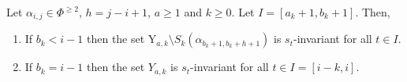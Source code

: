 \begin{lemma}\label{claim: third string lemma 1}
Let  $\alpha_{i,j} \in \Phi^{\geq 2}$, $h=j-i+1$,  $a\geq 1$ and $k\geq 0$.    
Let $I=[a_k+1, b_k+1]$.
Then,  
\begin{enumerate}
    \item\label{item (1) claim third string lemma 1}  If  $b_{k}<i-1$ then the set $\mathrm{Y}_{a,k}\setminus S_k(\alpha_{b_k+1,b_k+h+1}) $ is $s_t$-invariant  for all $t\in I$. 
    \item\label{item (2) claim third string lemma 1}  If  $b_k=i-1$ then the set $Y_{a,k}$ is $s_t$-invariant for all $t\in I =[i-k,i]$. 
\end{enumerate}
\end{lemma}



